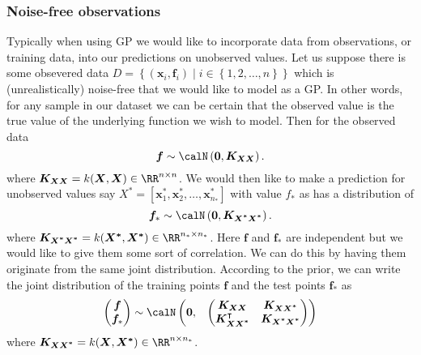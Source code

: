 \subsubsection{Noise-free observations}\label{Section1.4.1}
Typically when using GP we would like to incorporate data from observations, or training data, into our predictions on unobserved values.
Let us suppose there is some obsevered data $D = \left\{ (\bm{x}_i, \bm{f}_i) \mid i \in \left\{ 1,2, \ldots , n \right\} \right\}$ which is (unrealistically) noise-free that we would like to model as a GP. In other words, for any sample in our dataset we can be certain that the observed value is the true value of the underlying function we wish to model. Then for the observed data
\[
	\bm{f} \sim \calN \left( \bm{0}, \bm{K_{XX}} \right).
\]
where $\bm{K_{XX}} = k(\bm{X}, \bm{X}) \in \RR^{n \times n}$. We would then like to make a prediction for unobserved values say $X^{\ast} = \left[ \bm{x}_1^{\ast}, \bm{x}_2^{\ast}, \ldots , \bm{x}_{n_\ast}^{\ast} \right]$ with value $f_{\ast}$ as has a distribution of
\[
	\bm{f}_{\ast} \sim \calN \left( \bm{0}, \bm{K_{X^{\ast}X^{\ast}}} \right).
\]
where $\bm{K_{X^{\ast}X^{\ast}}} = k(\bm{X^{\ast}}, \bm{X^{\ast}}) \in \RR^{n_\ast \times n_\ast}$. Here $\bm{f}$ and $\bm{f}_{\ast}$ are independent but we would like to give them some sort of correlation. We can do this by having them originate from the same joint distribution. According to the prior, we can write the joint distribution of the training points $\bm{f}$ and the test points $\bm{f}_{\ast}$ as
\[
	\begin{pmatrix}
		\bm{f} \\
		\bm{f}_{\ast}
	\end{pmatrix}
	\sim \calN
	\begin{pmatrix}
		\bm{0}, &
		{
				\begin{pmatrix}
					\bm{K_{XX}}                    & \bm{K_{XX^{\ast}}}        \\
					\bm{K_{XX^{\ast}}}^{\intercal} & \bm{K_{X^{\ast}X^{\ast}}}
				\end{pmatrix}
			}
	\end{pmatrix}
\]
where $\bm{K_{XX^{\ast}}} = k(\bm{X}, \bm{X^{\ast}}) \in \RR^{n \times n_\ast}$.

